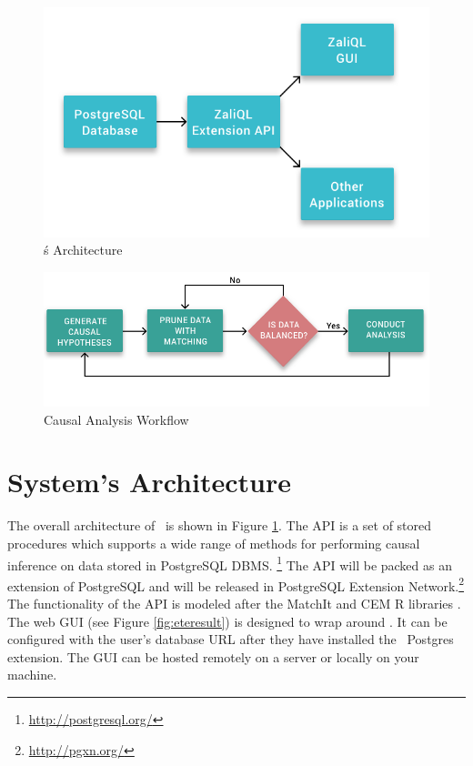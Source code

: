 
\begin{figure}
 \includegraphics[scale=0.25]{Figures/System-Overview.png}
 \caption{\GSQLB\'s Architecture}
  \label{fig:arch}
  \vspace{-3mm}
\end{figure}


\begin{figure}
  \includegraphics[scale=0.25]{Figures/Matching-Flowchart.png}
\caption{Causal Analysis Workflow }
\label{fig:flowchart}
\vspace{-0.3cm}
\end{figure}



\section{System's Architecture}

The overall architecture of \GSQL\ is shown in Figure \ref{fig:arch}.
The API is a set of stored procedures which supports a wide range of methods for performing causal inference on data stored in PostgreSQL DBMS. \footnote{\url{http://postgresql.org/}}
The API will be packed  as an extension of  PostgreSQL and will be released in 
PostgreSQL Extension Network.\footnote{\url{http://pgxn.org/}}
The functionality of the API is modeled after the MatchIt and CEM R libraries \cite{ho2005,iacus2009cem}. The web GUI (see Figure \ref{fig:eteresult}) is designed to wrap around \GSQL. It can be configured with the user's database URL after they have installed the \GSQL\ Postgres extension. The  GUI can be hosted remotely on a server or locally on your machine. 

